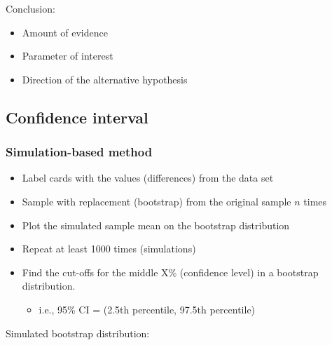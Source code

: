 \documentclass[
]{report}
\newenvironment{Shaded}{\begin{snugshade}}{\end{snugshade}}
\newcommand{\AttributeTok}[1]{\textcolor[rgb]{0.13,0.29,0.53}{#1}}
\newcommand{\CommentTok}[1]{\textcolor[rgb]{0.56,0.35,0.01}{\textit{#1}}}
\newcommand{\DecValTok}[1]{\textcolor[rgb]{0.00,0.00,0.81}{#1}}
\newcommand{\FloatTok}[1]{\textcolor[rgb]{0.00,0.00,0.81}{#1}}
\newcommand{\FunctionTok}[1]{\textcolor[rgb]{0.13,0.29,0.53}{\textbf{#1}}}
\newcommand{\NormalTok}[1]{#1}
\newcommand{\SpecialCharTok}[1]{\textcolor[rgb]{0.81,0.36,0.00}{\textbf{#1}}}
\providecommand{\tightlist}{%
  \setlength{\itemsep}{0pt}\setlength{\parskip}{0pt}}
\begin{document}
\vspace{0.8in}

\newpage

Conclusion:

\begin{itemize}
\item
  Amount of evidence
\item
  Parameter of interest
\item
  Direction of the alternative hypothesis
\end{itemize}

\vspace{0.8in}

\subsection*{Confidence interval}\label{confidence-interval-3}

\subsubsection*{Simulation-based method}\label{simulation-based-method-7}

\begin{itemize}
\item
  Label cards with the values (differences) from the data set
\item
  Sample with replacement (bootstrap) from the original sample \(n\) times
\item
  Plot the simulated sample mean on the bootstrap distribution
\item
  Repeat at least 1000 times (simulations)
\item
  Find the cut-offs for the middle X\% (confidence level) in a bootstrap distribution.

  \begin{itemize}
  \tightlist
  \item
    i.e., 95\% CI = (2.5th percentile, 97.5th percentile)
  \end{itemize}
\end{itemize}

Simulated bootstrap distribution:

\begin{Shaded}
\end{Shaded}
\end{document}
